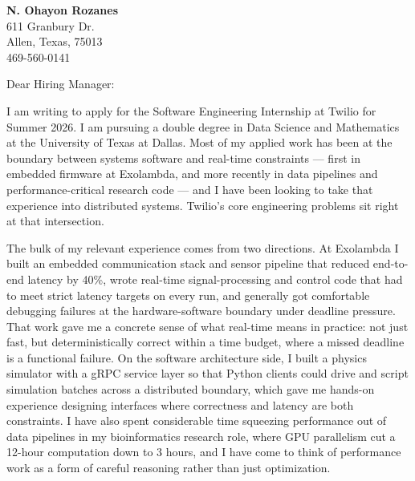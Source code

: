 \documentclass{letter}
\begin{document}
\signature{N. Ohayon Rozanes}
\longindentation=0pt
\let\raggedleft\raggedright

\begin{letter}{}

  \begin{center}
    {\large\bf N. Ohayon Rozanes} \\
    {611 Granbury Dr. \\ Allen, Texas, 75013 \\ 469-560-0141}
  \end{center} \vfill

  \opening{Dear Hiring Manager:}

  \noindent I am writing to apply for the Software Engineering Internship at
  Twilio for Summer 2026. I am pursuing a double degree in Data Science and
  Mathematics at the University of Texas at Dallas. Most of my applied work
  has been at the boundary between systems software and real-time
  constraints --- first in embedded firmware at Exolambda, and more recently
  in data pipelines and performance-critical research code --- and I have
  been looking to take that experience into distributed systems. Twilio's
  core engineering problems sit right at that intersection.

  \noindent The bulk of my relevant experience comes from two directions. At
  Exolambda I built an embedded communication stack and sensor pipeline that
  reduced end-to-end latency by 40\%, wrote real-time signal-processing and
  control code that had to meet strict latency targets on every run, and
  generally got comfortable debugging failures at the hardware-software
  boundary under deadline pressure. That work gave me a concrete sense of
  what real-time means in practice: not just fast, but deterministically
  correct within a time budget, where a missed deadline is a functional
  failure. On the software architecture side, I built a physics simulator
  with a gRPC service layer so that Python clients could drive and script
  simulation batches across a distributed boundary, which gave me hands-on
  experience designing interfaces where correctness and latency are both
  constraints. I have also spent considerable time squeezing performance out
  of data pipelines in my bioinformatics research role, where GPU
  parallelism cut a 12-hour computation down to 3 hours, and I have come to
  think of performance work as a form of careful reasoning rather than just
  optimization.


\end{letter}
\end{document}
